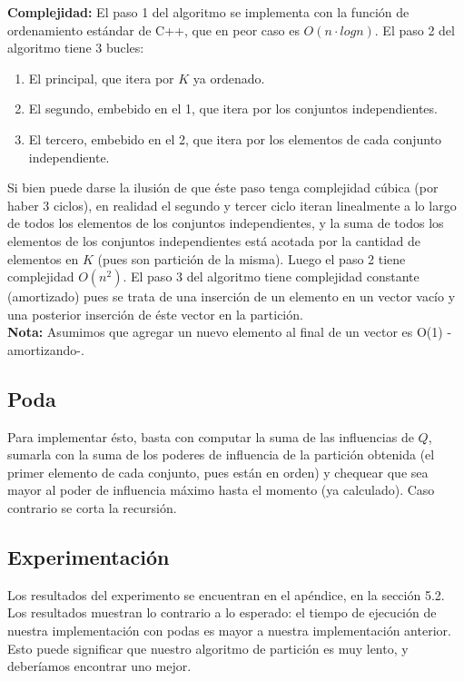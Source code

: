 \documentclass[10pt, a4paper]{article}
\begin{document}
\textbf{Complejidad: } El paso 1 del algoritmo se implementa con la funci\'on de ordenamiento est\'andar de C++, que en peor caso es $O(n \cdot log n)$.
El paso 2 del algoritmo tiene 3 bucles:
\begin{enumerate}
    \item El principal, que itera por $K$ ya ordenado.
    \item El segundo, embebido en el 1, que itera por los conjuntos independientes.
    \item El tercero, embebido en el 2, que itera por los elementos de cada conjunto independiente.
\end{enumerate}
Si bien puede darse la ilusi\'on de que \'este paso tenga complejidad c\'ubica (por haber 3 ciclos), en realidad el segundo y tercer ciclo iteran linealmente a lo largo de todos los elementos de los conjuntos independientes, y la suma de todos los elementos de los conjuntos independientes est\'a acotada por la cantidad de elementos en $K$ (pues son partici\'on de la misma). Luego el paso 2 tiene complejidad $O(n^2)$.
El paso 3 del algoritmo tiene complejidad constante (amortizado) pues se trata de una inserci\'on de un elemento en un vector vac\'io y una posterior inserci\'on de \'este vector en la partici\'on. \\

\textbf{Nota:} Asumimos que agregar un nuevo elemento al final de un vector es O(1) -amortizando-.

\subsection{Poda}
Para implementar \'esto, basta con computar la suma de las influencias de $Q$, sumarla con la suma de los poderes de influencia de la partici\'on obtenida (el primer elemento de cada conjunto, pues est\'an en orden) y chequear que sea mayor al poder de influencia m\'aximo hasta el momento (ya calculado). Caso contrario se corta la recursi\'on.\\

\subsection{Experimentaci\'on}

Los resultados del experimento se encuentran en el apéndice, en la sección 5.2. Los resultados muestran lo contrario a lo esperado: el tiempo de ejecución de nuestra implementación con podas es mayor a nuestra implementación anterior. Esto puede significar que nuestro algoritmo de partición es muy lento, y deberíamos encontrar uno mejor.
\end{document}
